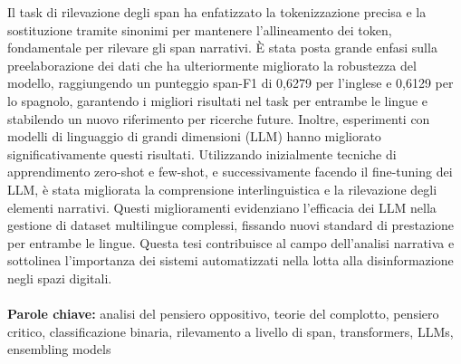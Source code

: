\documentclass{Configuration_Files/PoliMi3i_thesis}
\begin{document}
Il task di rilevazione degli span ha enfatizzato la tokenizzazione precisa e la sostituzione tramite sinonimi per mantenere l’allineamento dei token, fondamentale per rilevare gli span narrativi. È stata posta grande enfasi sulla preelaborazione dei dati che ha ulteriormente migliorato la robustezza del modello, raggiungendo un punteggio span-F1 di 0,6279 per l’inglese e 0,6129 per lo spagnolo, garantendo i migliori risultati nel task per entrambe le lingue e stabilendo un nuovo riferimento per ricerche future. Inoltre, esperimenti con modelli di linguaggio di grandi dimensioni (LLM) hanno migliorato significativamente questi risultati. Utilizzando inizialmente tecniche di apprendimento zero-shot e few-shot, e successivamente facendo il fine-tuning dei LLM, è stata migliorata la comprensione interlinguistica e la rilevazione degli elementi narrativi. Questi miglioramenti evidenziano l'efficacia dei LLM nella gestione di dataset multilingue complessi, fissando nuovi standard di prestazione per entrambe le lingue. Questa tesi contribuisce al campo dell'analisi narrativa e sottolinea l'importanza dei sistemi automatizzati nella lotta alla disinformazione negli spazi digitali.
\\
\\
\textbf{Parole chiave:} analisi del pensiero oppositivo, teorie del complotto, pensiero critico, classificazione binaria, rilevamento a livello di span, transformers, LLMs, ensembling models %


\thispagestyle{empty}
\tableofcontents %
\thispagestyle{empty}
\cleardoublepage

%
%
%    
%
\end{document}
